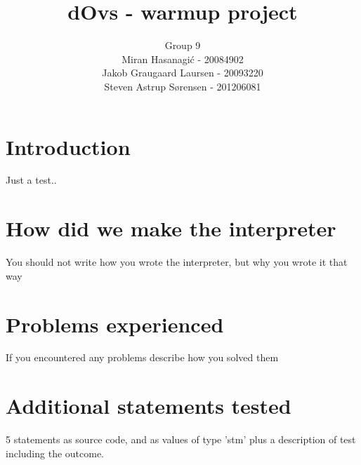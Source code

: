 \documentclass[a4paper]{article}
\title{dOvs - warmup project}
\author{
  Group 9 \\
  Miran Hasanagi\'{c} - 20084902 \\
  Jakob Graugaard Laursen - 20093220\\
  Steven Astrup S\o rensen - 201206081
}
\begin{document}
\maketitle

\section{Introduction}
Just a test..

\section{How did we make the interpreter}
You should not write how you wrote the interpreter, but why you wrote it that way

\section{Problems experienced}
If you encountered any problems describe how you solved them

\section{Additional statements tested}
5 statements as source code, and as values of type 'stm' plus a description of test including the outcome.
\end{document}
